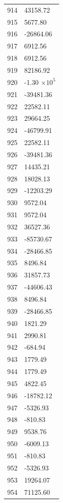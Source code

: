 \documentclass[a4paper,11pt]{article}
\begin{document}
\begin{center}
\begin{longtable}{|R{1.5cm}|R{2.5cm}|}
  914 &     43158.72 \\
  915 &      5677.80 \\
  916 &    -26864.06 \\
  917 &      6912.56 \\
  918 &      6912.56 \\
  919 &     82186.92 \\
  920 &        -1.30 $\times 10^{           5}$ \\
  921 &    -39481.36 \\
  922 &     22582.11 \\
  923 &     29664.25 \\
  924 &    -46799.91 \\
  925 &     22582.11 \\
  926 &    -39481.36 \\
  927 &     14435.21 \\
  928 &     18028.13 \\
  929 &    -12203.29 \\
  930 &      9572.04 \\
  931 &      9572.04 \\
  932 &     36527.36 \\
  933 &    -85730.67 \\
  934 &    -28466.85 \\
  935 &      8496.84 \\
  936 &     31857.73 \\
  937 &    -44606.43 \\
  938 &      8496.84 \\
  939 &    -28466.85 \\
  940 &      1821.29 \\
  941 &      2990.81 \\
  942 &      -684.94 \\
  943 &      1779.49 \\
  944 &      1779.49 \\
  945 &      4822.45 \\
  946 &    -18782.12 \\
  947 &     -5326.93 \\
  948 &      -810.83 \\
  949 &      9538.76 \\
  950 &     -6009.13 \\
  951 &      -810.83 \\
  952 &     -5326.93 \\
  953 &     19264.07 \\
  954 &     71125.60 \\

\end{longtable}
\end{center}
\end{document}
